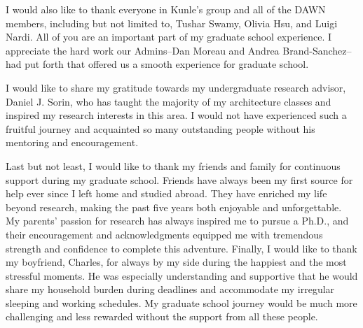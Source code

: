 I would also like to thank everyone in Kunle's group and all of the DAWN members, including but not limited to, 
Tushar Swamy, Olivia Hsu, and Luigi Nardi. 
All of you are an important part of my graduate school experience.
I appreciate the hard work our Admins--Dan Moreau and Andrea Brand-Sanchez--had put forth that
offered us a smooth experience for graduate school.

I would like to share my gratitude towards my undergraduate research advisor, Daniel J. Sorin, who has taught the
majority of my architecture classes and inspired my research interests in this area.
I would not have experienced such a fruitful journey and acquainted so many outstanding people
without his mentoring and encouragement.

Last but not least, I would like to thank my friends and family for continuous support during my
graduate school. 
Friends have always been my first source for help ever since I left home and studied abroad.
They have enriched my life beyond research, making the past five years both enjoyable and
unforgettable.
My parents' passion for research has always inspired me to pursue a Ph.D., and their encouragement and
acknowledgments equipped me with tremendous strength and confidence to complete this adventure.
Finally, I would like to thank my boyfriend, Charles, for always by my side during the happiest and the most stressful moments. 
He was especially understanding and supportive that he would
share my household burden during deadlines and accommodate my irregular sleeping and working schedules.
My graduate school journey would be much more challenging and less rewarded without the support from all these people.
